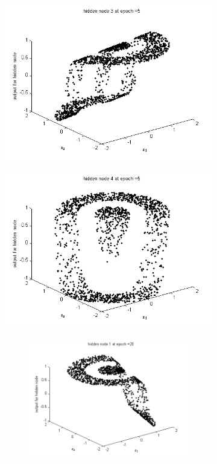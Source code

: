 \documentclass{article}
\begin{document}
\begin{figure}
\begin{subfigure}{.5\textwidth}
  \centering
  \includegraphics[width=.8\linewidth]{Classification/nonlinearlySeparable/h5_3}
 
\end{subfigure}%
\begin{subfigure}{.5\textwidth}
  \centering
  \includegraphics[width=.8\linewidth]{Classification/nonlinearlySeparable/h5_4}
  \end{subfigure}
\caption{Epoch 5 hidden nodes 3 and 4}


\begin{figure}
\begin{subfigure}{.5\textwidth}
  \centering
  \includegraphics[width=.8\linewidth]{Classification/nonlinearlySeparable/h20_1}
 

\end{subfigure}
\end{figure}
\end{figure}
\end{document}
